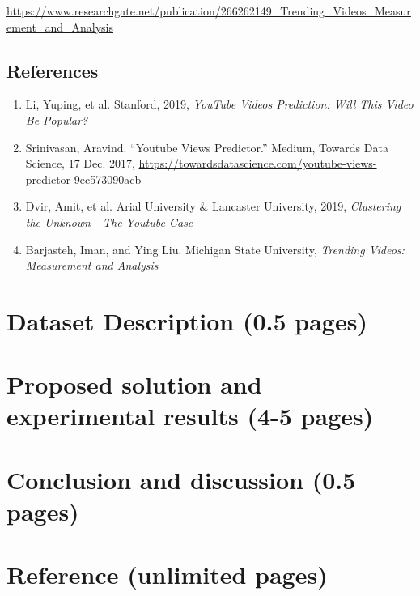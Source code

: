 \documentclass{article}
\begin{document}
\href{https://www.researchgate.net/publication/266262149_Trending_Videos_Measurement_and_Analysis}{https://www.researchgate.net/publication/266262149\_Trending\_Videos\_Measurement\_and\_Analysis} 

\subsection*{References}
\begin{enumerate}
  \item Li, Yuping, et al. Stanford, 2019, \textit{YouTube Videos Prediction: Will This Video Be Popular?} 
  \item Srinivasan, Aravind. “Youtube Views Predictor.” Medium, Towards Data Science, 17 Dec. 2017, \href{https://towardsdatascience.com/youtube-views-predictor-9ec573090acb}{https://towardsdatascience.com/youtube-views-predictor-9ec573090acb}
  \item Dvir, Amit, et al. Arial University \& Lancaster University, 2019, \textit{Clustering the Unknown - The Youtube Case}
  \item Barjasteh, Iman, and Ying Liu. Michigan State University, \textit{Trending Videos: Measurement and Analysis}
\end{enumerate}


\section*{Dataset Description (0.5 pages)}
\section*{Proposed solution and experimental results (4-5 pages)}
\section*{Conclusion and discussion (0.5 pages)}
\section*{Reference (unlimited pages)}
\end{document}
